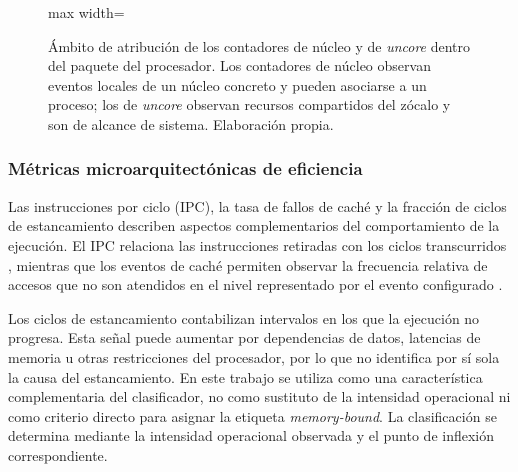 \documentclass[12pt,oneside,spanish]{book}
\begin{document}
\begin{figure}[H]
\begin{adjustbox}{max width=\textwidth}
\end{adjustbox}
\caption[Contadores de núcleo y contadores de \textit{uncore}]{Ámbito de
atribución de los contadores de núcleo y de \textit{uncore} dentro del paquete
del procesador. Los contadores de núcleo observan eventos locales de un núcleo
concreto y pueden asociarse a un proceso; los de \textit{uncore} observan
recursos compartidos del zócalo y son de alcance de sistema. Elaboración propia.}
\label{fig:core-uncore-counters}
\end{figure}

\subsubsection{Métricas microarquitectónicas de eficiencia}

Las instrucciones por ciclo (IPC), la tasa de fallos de caché y la fracción
de ciclos de estancamiento describen aspectos complementarios del
comportamiento de la ejecución. El IPC relaciona las instrucciones retiradas
con los ciclos transcurridos \cite[Ch.~6]{Gregg2020}, mientras que los eventos
de caché permiten observar la frecuencia relativa de accesos que no son
atendidos en el nivel representado por el evento configurado
\cite[Ch.~2]{Gregg2020}.

Los ciclos de estancamiento contabilizan intervalos en los que la ejecución no
progresa. Esta señal puede aumentar por dependencias de datos, latencias de
memoria u otras restricciones del procesador, por lo que no identifica por sí
sola la causa del estancamiento. En este trabajo se utiliza como una
característica complementaria del clasificador, no como sustituto de la
intensidad operacional ni como criterio directo para asignar la etiqueta
\textit{memory-bound}. La clasificación se determina mediante la intensidad
operacional observada y el punto de inflexión correspondiente.
\end{document}
